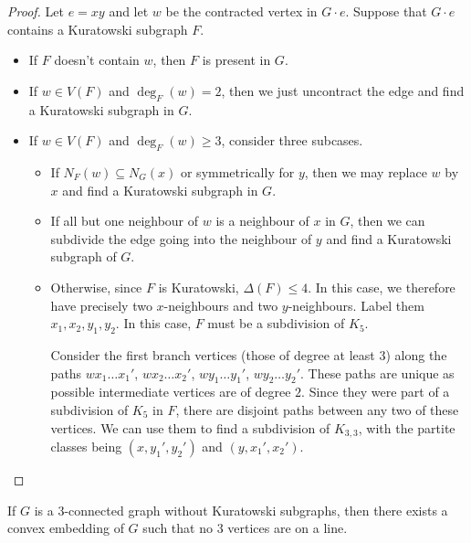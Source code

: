 \begin{proof}
  Let $e = xy$ and let $w$ be the contracted vertex in $G \cdot e$.
  Suppose that $G \cdot e$ contains a Kuratowski subgraph $F$.
  \begin{itemize}
  \item If $F$ doesn't contain $w$, then $F$ is present in $G$.
  \item If $w \in V(F)$ and $\deg_F(w) = 2$, then we just uncontract the edge
	and find a Kuratowski subgraph in $G$.
  \item If $w \in V(F)$ and $\deg_F(w) \ge 3$, consider three subcases.
	\begin{itemize}
	\item If $N_F(w) \subseteq N_G(x)$ or symmetrically for $y$, then we may
	  replace $w$ by $x$ and find a Kuratowski subgraph in $G$.
	\item If all but one neighbour of $w$ is a neighbour of $x$ in $G$, then we
	  can subdivide the edge going into the neighbour of $y$ and find a
	  Kuratowski subgraph of $G$.
	\item Otherwise, since $F$ is Kuratowski, $\Delta(F) \le 4$.
	  In this case, we therefore have precisely two $x$-neighbours and two
	  $y$-neighbours.
	  Label them $x_1, x_2, y_1, y_2$.
	  In this case, $F$ must be a subdivision of $K_5$.

	  Consider the first branch vertices (those of degree at least $3$) along
	  the paths $w x_1 \ldots x_1'$, $w x_2 \ldots x_2'$, $w y_1 \ldots y_1'$,
	  $w y_2 \ldots y_2'$.
	  These paths are unique as possible intermediate vertices are of degree
	  $2$.
	  Since they were part of a subdivision of $K_5$ in $F$, there are disjoint
	  paths between any two of these vertices.
	  We can use them to find a subdivision of $K_{3,3}$, with the partite
	  classes being $(x,y_1', y_2')$ and $(y, x_1', x_2')$.
	  \qedhere
	\end{itemize}
  \end{itemize}
\end{proof}

\begin{theorem}
  \label{theorem:tg-kuratowski-7}
  If $G$ is a $3$-connected graph without Kuratowski subgraphs, then there
  exists a convex embedding of $G$ such that no $3$ vertices are on a line.
\end{theorem}

